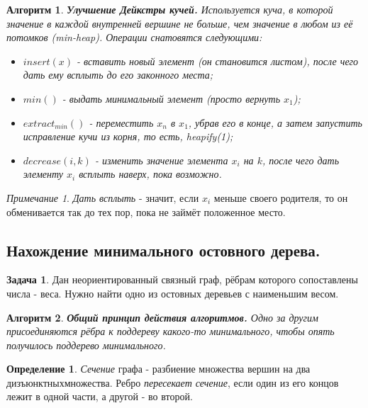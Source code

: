 \documentclass[a4paper]{article}
\theoremstyle{indented}
\newtheorem{alg}{Алгоритм}
\theoremstyle{definition}
\newtheorem{defn}{Определение}
\newtheorem{prob}{Задача}
\theoremstyle{remark}
\newtheorem{remark}{Примечание}
\begin{document}
\begin{alg}
    \textbf{Улучшение Дейкстры кучей.} Используется куча, в которой значение в каждой внутренней вершине не больше, чем значение в любом из её потомков (min-heap). Операции снатовятся следующими:

    \begin{itemize}
        \item $insert(x)$ - вставить новый элемент (он становится листом), после чего дать ему всплыть до его законного места; 
        \item $min()$ - выдать минимальный элемент (просто вернуть $x_1$); 
        \item $extract_{min}()$ - переместить $x_n$ в $x_1$, убрав его в конце, а затем запустить исправление кучи из корня, то есть, heapify(1); 
        \item $decrease(i, k)$ - изменить значение элемента $x_i$ на $k$, после чего дать элементу $x_i$ всплыть наверх, пока возможно. 
    \end{itemize}
\end{alg}

\begin{remark}
    \textit{Дать всплыть} - значит, если $x_i$ меньше своего родителя, то он обменивается так до тех пор, пока не займёт положенное место.
\end{remark}

\subsection{Нахождение минимального остовного дерева.}

\begin{prob}
    Дан неориентированный связный граф, рёбрам которого сопоставлены числа - веса. Нужно найти одно из остовных деревьев с наименьшим весом.
\end{prob}

\begin{alg}
    \textbf{Общий принцип действия алгоритмов.} Одно за другим присоединяются рёбра к поддереву какого-то минимального, чтобы опять получилось поддерево минимального.
\end{alg}

\begin{defn}
    \textit{Сечение} графа - разбиение множества вершин на два дизъюнктныхмножества. Ребро \textit{пересекает сечение}, если один из его концов лежит в одной части, а другой - во второй. 
\end{defn}
\end{document}
